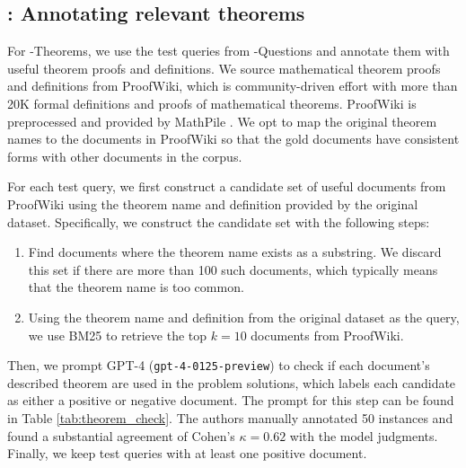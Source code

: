 





\subsection{\theorem: Annotating relevant theorems}
\label{app:theoremqa_theorems}

For \theorem-Theorems, we use the test queries from \theorem-Questions and annotate them with useful theorem proofs and definitions.
We source mathematical theorem proofs and definitions from ProofWiki, which is community-driven effort with more than 20K formal definitions and proofs of mathematical theorems.
ProofWiki is preprocessed and provided by MathPile \citep{wang2023generativeaimathi}.
We opt to map the original theorem names to the documents in ProofWiki so that the gold documents have consistent forms with other documents in the corpus.

For each test query, we first construct a candidate set of useful documents from ProofWiki using the theorem name and definition provided by the original \theorem dataset.
Specifically, we construct the candidate set with the following steps: 
\begin{enumerate}
    \item Find documents where the theorem name exists as a substring. We discard this set if there are more than 100 such documents, which typically means that the theorem name is too common.
    \item Using the theorem name and definition from the original dataset as the query, we use BM25 to retrieve the top $k=10$ documents from ProofWiki.
\end{enumerate}

Then, we prompt GPT-4 (\texttt{gpt-4-0125-preview}) to check if each document's described theorem are used in the problem solutions, which labels each candidate as either a positive or negative document.
The prompt for this step can be found in Table \ref{tab:theorem_check}.
The authors manually annotated 50 instances and found a substantial agreement of Cohen's $\kappa = 0.62$ with the model judgments.
Finally, we keep test queries with at least one positive document.



